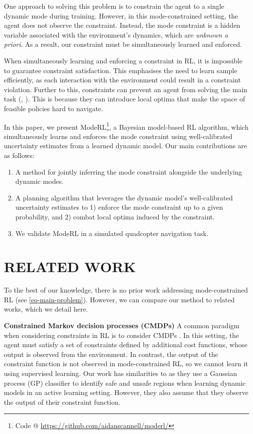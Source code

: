 \documentclass[twoside]{article}
\begin{document}
One approach to solving this problem is to constrain the agent to a single dynamic mode during training.
However, in this mode-constrained setting, the agent does not observe the constraint.
Instead, the mode constraint is a hidden variable associated with the environment's dynamics, which are \emph{unknown a priori}.
As a result, our constraint must be simultaneously learned and enforced.

When simultaneously learning and enforcing a constraint in RL, it is impossible to guarantee constraint satisfaction.
This emphasises the need to learn sample efficiently, as each interaction with the environment could result in a constraint violation.
Further to this, constraints can prevent an agent from solving the main task (, ).
This is because they can introduce local optima that make the space of feasible policies hard to navigate.

In this paper, we present ModeRL\footnote{Code @ \href{https://github.com/aidanscannell/moderl/}{https://github.com/aidanscannell/moderl/}},
a Bayesian model-based RL algorithm, which simultaneously learns and enforces the mode constraint using
well-calibrated uncertainty estimates from a learned dynamic model.
Our main contributions are as follows:
\begin{enumerate}
\item A method for jointly inferring the mode constraint alongside the underlying dynamic modes.
\item A planning algorithm that leverages the dynamic model's well-calibrated uncertainty estimates to 1) enforce the mode constraint up to a given probability, and 2) combat local optima induced by the constraint.
\item We validate ModeRL in a simulated quadcopter navigation task.
\end{enumerate}
\section{RELATED WORK}
\label{sec:orgf0886fa}
To the best of our knowledge, there is no prior work addressing mode-constrained RL (see \cref{eq-main-problem}).
However, we can compare our method to related works, which we detail here.

\textbf{Constrained Markov decision processes (CMDPs)}
A common paradigm when considering constraints in RL is to consider CMDPs \citep{altmanConstrained1999,wachiSafeExplorationOptimization2018}.
In this setting, the agent must satisfy a set of constraints defined by additional cost functions, whose output is observed from the environment.
In contrast, the output of the constraint function is not observed in mode-constrained RL, so we cannot learn it using supervised learning.
Our work has similarities to \cite{schreiterSafe2015} as they use a Gaussian process (GP) classifier to identify safe and unsafe regions
when learning dynamic models in an active learning setting.
However, they also assume that they observe the output of their constraint function.
\end{document}

